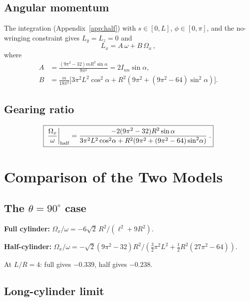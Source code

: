 \documentclass[11pt]{article}
\begin{document}
\subsection{Angular momentum}

The integration (Appendix~\ref{app:half}) with $s\in[0,L]$,
$\phi\in[0,\pi]$, and the no-wringing constraint gives $L_y=L_z=0$
and
\begin{equation}\label{eq:Lx_half}
L_x = A\,\omega + B\,\Omega_x\,,
\end{equation}
where
\begin{align}
A &= \frac{(9\pi^2-32)mR^2\sin\alpha}{9\pi^2}
  = 2I_{nn}\sin\alpha, \label{eq:Ahalf}\\
B &= \frac{m}{18\pi^2}\bigl[3\pi^2L^2\cos^2\!\alpha
  +R^2(9\pi^2+(9\pi^2-64)\sin^2\!\alpha)\bigr].
  \label{eq:Bhalf}
\end{align}

\subsection{Gearing ratio}

\begin{equation}\label{eq:gear_half}
\boxed{\;
\frac{\Omega_x}{\omega}\bigg|_{\rm half}
= \frac{-2(9\pi^2-32)R^2\sin\alpha}
  {3\pi^2L^2\cos^2\!\alpha
  +R^2(9\pi^2+(9\pi^2-64)\sin^2\!\alpha)}\;.}
\end{equation}

\section{Comparison of the Two Models}
\label{sec:compare}

\subsection{The $\theta=90^\circ$ case}

\noindent\textbf{Full cylinder:}\quad
$\Omega_x/\omega = -6\sqrt{2}\,R^2/(\ell^2+9R^2)$.

\noindent\textbf{Half-cylinder:}\quad
$\Omega_x/\omega = -\sqrt{2}(9\pi^2-32)R^2/
(\tfrac{3}{2}\pi^2L^2+\tfrac{1}{2}R^2(27\pi^2-64))$.

At $L/R=4$: full gives $-0.339$, half gives $-0.238$.

\subsection{Long-cylinder limit}
\end{document}
